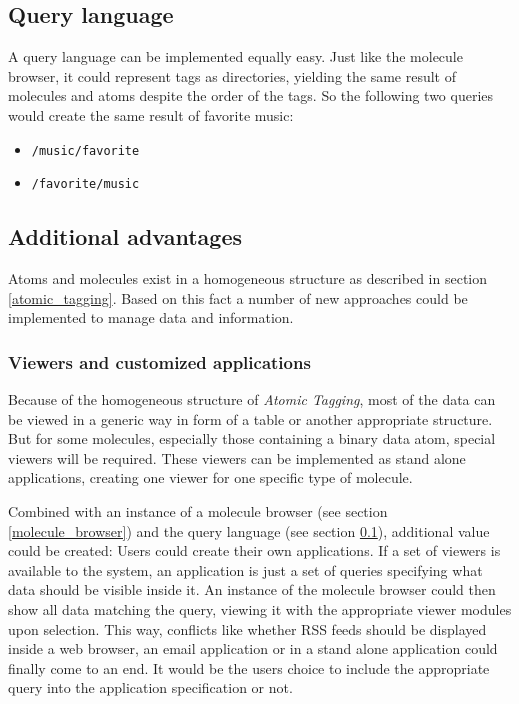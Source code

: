 \documentclass[12pt,a4paper,notitlepage,twocolumn,oneside]{article}
\newcommand{\at}{{\emph{Atomic Tagging}}}
\begin{document}
\subsection{Query language}\label{query_language}
A query language can be implemented equally easy. Just like the molecule browser, it could represent tags as directories, yielding the same result of molecules and atoms despite the order of the tags. So the following two queries would create the same result of favorite music:

\begin{itemize}
\item \texttt{/music/favorite}
\item \texttt{/favorite/music}
\end{itemize}

\subsection{Additional advantages}
Atoms and molecules exist in a homogeneous structure as described in section \ref{atomic_tagging}. Based on this fact a number of new approaches could be implemented to manage data and information.

\subsubsection{Viewers and customized applications}
Because of the homogeneous structure of \at{,} most of the data can be viewed in a generic way in form of a table or another appropriate structure. But for some molecules, especially those containing a binary data atom, special viewers will be required. These viewers can be implemented as stand alone applications, creating one viewer for one specific type of molecule.

Combined with an instance of a molecule browser (see section \ref{molecule_browser}) and the query language (see section \ref{query_language}), additional value could be created: Users could create their own applications. If a set of viewers is available to the system, an application is just a set of queries specifying what data should be visible inside it. An instance of the molecule browser could then show all data matching the query, viewing it with the appropriate viewer modules upon selection. This way, conflicts like whether RSS feeds should be displayed inside a web browser, an email application or in a stand alone application could finally come to an end. It would be the users choice to include the appropriate query into the application specification or not.
\end{document}

